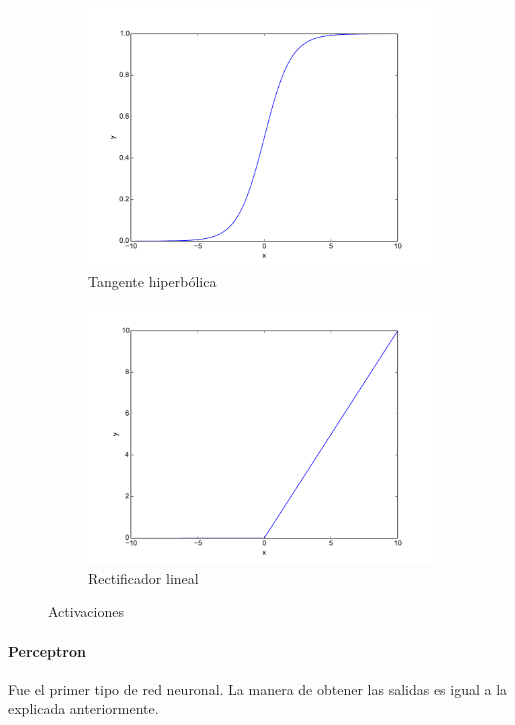 \begin{figure}
\begin{subfigure}[b]{0.5\textwidth}
		\includegraphics[width=\linewidth]{imagenes/metodos/sigmoid.pdf}
		\caption{Tangente hiperbólica}
		\label{fig:metodos/tanh}
	\end{subfigure}
	\begin{subfigure}[b]{0.5\textwidth}
		\centering
		\includegraphics[width=\linewidth]{imagenes/metodos/relu.pdf}
		\caption{Rectificador lineal}
		\label{fig:metodos/relu}
	\end{subfigure}
	\caption{Activaciones}
	\label{fig:metodos/activations}
\end{figure}
\paragraph{Perceptron}
Fue el primer tipo de red neuronal. La manera de obtener las salidas es igual a la explicada anteriormente.

